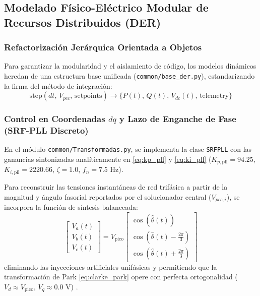\subsection{Modelado Físico-Eléctrico Modular de Recursos Distribuidos (DER)}

\subsubsection{Refactorización Jerárquica Orientada a Objetos}
Para garantizar la modularidad y el aislamiento de código, los modelos dinámicos heredan de una estructura base unificada (\texttt{common/base\_der.py}), estandarizando la firma del método de integración:
\[
\text{step}(dt, \, V_{pcc}, \, \text{setpoints}) \longrightarrow \{P(t), \, Q(t), \, V_{dc}(t), \, \text{telemetry}\}
\]

\subsubsection{Control en Coordenadas \texorpdfstring{$dq$}{dq} y Lazo de Enganche de Fase (SRF-PLL Discreto)}
En el módulo \texttt{common/Transformadas.py}, se implementa la clase \texttt{SRFPLL} con las ganancias sintonizadas analíticamente en \eqref{eq:kp_pll} y \eqref{eq:ki_pll} ($K_{p,\text{pll}} = 94.25$, $K_{i,\text{pll}} = 2220.66$, $\zeta = 1.0$, $f_n = 7.5\text{ Hz}$).

Para reconstruir las tensiones instantáneas de red trifásica a partir de la magnitud y ángulo fasorial reportados por el solucionador central ($V_{pcc, i}$), se incorpora la función de síntesis balanceada:
\[
\begin{bmatrix} V_a(t) \\ V_b(t) \\ V_c(t) \end{bmatrix} = V_{\text{pico}} \begin{bmatrix} \cos(\hat{\theta}(t)) \\ \cos\left(\hat{\theta}(t) - \frac{2\pi}{3}\right) \\ \cos\left(\hat{\theta}(t) + \frac{2\pi}{3}\right) \end{bmatrix}
\]
eliminando las inyecciones artificiales unifásicas y permitiendo que la transformación de Park \eqref{eq:clarke_park} opere con perfecta ortogonalidad ($V_d \approx V_{\text{pico}}, \, V_q \approx 0.0\text{ V}$) \citep{Kundu2024ICCFPLL}.

